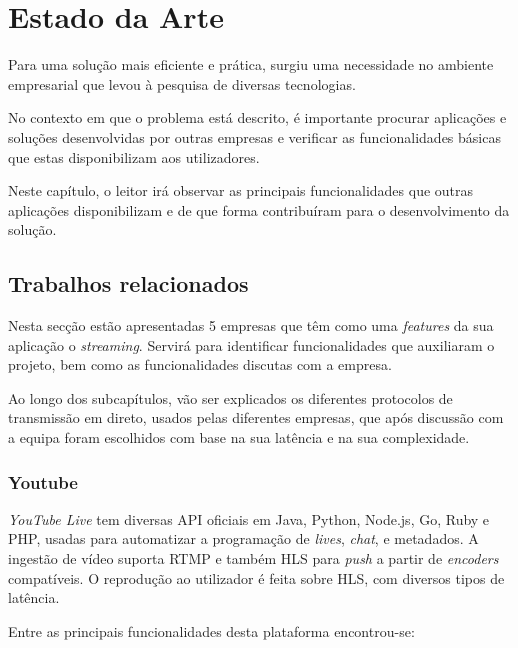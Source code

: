 % 
\chapter{Estado da Arte} %
\label{chap:EA} %

Para uma solução mais eficiente e prática, surgiu uma necessidade no ambiente empresarial que levou à pesquisa de diversas tecnologias.

No contexto em que o problema está descrito, é importante procurar aplicações e soluções desenvolvidas por outras empresas e verificar as funcionalidades básicas que estas disponibilizam aos utilizadores.

Neste capítulo, o leitor irá observar as principais funcionalidades que outras aplicações disponibilizam e de que forma contribuíram para o desenvolvimento da solução.


\section{Trabalhos relacionados} 
\label{sec:TR} 

Nesta secção estão apresentadas 5 empresas que têm como uma \textit{features} da sua aplicação o \textit{streaming}. Servirá para identificar funcionalidades que auxiliaram o projeto, bem como as funcionalidades discutas com a empresa.

Ao longo dos subcapítulos, vão ser explicados os diferentes protocolos de transmissão em direto, usados pelas diferentes empresas, que após discussão com a equipa foram escolhidos com base na sua latência e na sua complexidade.

\subsection{Youtube}

\textit{YouTube Live} tem diversas \gls{API} oficiais em Java, Python, Node.js, Go, Ruby e PHP, usadas para automatizar a programação de \textit{lives}, \textit{chat}, e metadados. A ingestão de vídeo suporta \gls{RTMP} e também \gls{HLS} para \textit{push} a partir de \textit{encoders} compatíveis. O reprodução ao utilizador é feita sobre HLS, com diversos tipos de latência.\cite{YouTube_Client_Live_Streaming_API}

Entre as principais funcionalidades desta plataforma encontrou-se:

